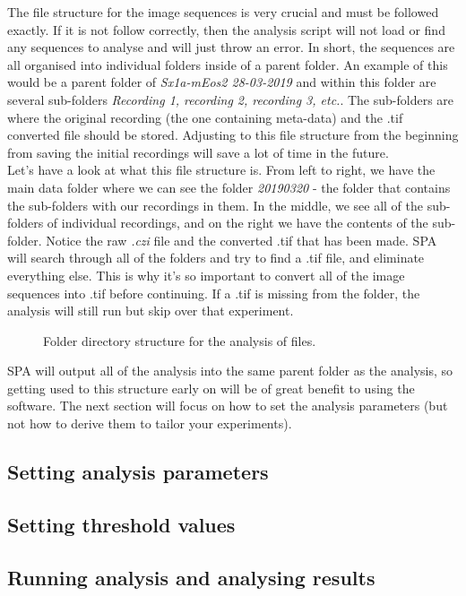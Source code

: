 \documentclass[11pt]{article} %
\begin{document}
The file structure for the image sequences is very crucial and must be followed exactly. If it is not follow correctly, then the analysis script will not load or find any sequences to analyse and will just throw an error. In short, the sequences are all organised into individual folders inside of a parent folder. An example of this would be a parent folder of \textit{Sx1a-mEos2 28-03-2019} and within this folder are several sub-folders \textit{Recording 1, recording 2, recording 3, etc.}. The sub-folders are where the original recording (the one containing meta-data) and the .tif converted file should be stored. Adjusting to this file structure from the beginning from saving the initial recordings will save a lot of time in the future.\\

Let's have a look at what this file structure is. From left to right, we have the main data folder where we can see the folder \textit{20190320} - the folder that contains the sub-folders with our recordings in them. In the middle, we see all of the sub-folders of individual recordings, and on the right we have the contents of the sub-folder. Notice the raw \textit{.czi} file and the converted .tif that has been made. SPA will search through all of the folders and try to find a .tif file, and eliminate everything else. This is why it's so important to convert all of the image sequences into .tif before continuing. If a .tif is missing from the folder, the analysis will still run but skip over that experiment.

	\begin{figure}[H]
	\caption{Folder directory structure for the analysis of files.}
	\end{figure}

SPA will output all of the analysis into the same parent folder as the analysis, so getting used to this structure early on will be of great benefit to using the software. The next section will focus on how to set the analysis parameters (but not how to derive them to tailor your experiments).

\subsection{Setting analysis parameters}

\subsection{Setting threshold values}

\subsection{Running analysis and analysing results}
\end{document}
